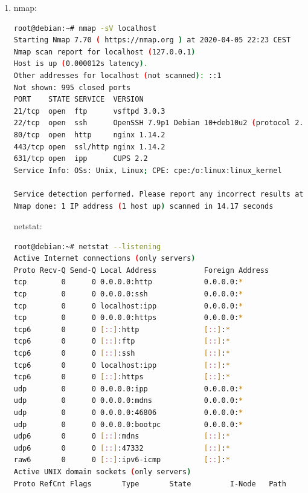 \documentclass[10pt,a4paper]{article}
\begin{document}
\begin{enumerate}[label=\textbf{\alph*)}]
\item nmap:
\begin{lstlisting}[language=bash]
root@debian:~# nmap -sV localhost
Starting Nmap 7.70 ( https://nmap.org ) at 2020-04-05 22:23 CEST
Nmap scan report for localhost (127.0.0.1)
Host is up (0.000012s latency).
Other addresses for localhost (not scanned): ::1
Not shown: 995 closed ports
PORT    STATE SERVICE  VERSION
21/tcp  open  ftp      vsftpd 3.0.3
22/tcp  open  ssh      OpenSSH 7.9p1 Debian 10+deb10u2 (protocol 2.0)
80/tcp  open  http     nginx 1.14.2
443/tcp open  ssl/http nginx 1.14.2
631/tcp open  ipp      CUPS 2.2
Service Info: OSs: Unix, Linux; CPE: cpe:/o:linux:linux_kernel

Service detection performed. Please report any incorrect results at https://nmap.org/submit/ .
Nmap done: 1 IP address (1 host up) scanned in 14.17 seconds
\end{lstlisting}
netstat:
\begin{lstlisting}[language=bash]
root@debian:~# netstat --listening
Active Internet connections (only servers)
Proto Recv-Q Send-Q Local Address           Foreign Address         State      
tcp        0      0 0.0.0.0:http            0.0.0.0:*               LISTEN     
tcp        0      0 0.0.0.0:ssh             0.0.0.0:*               LISTEN     
tcp        0      0 localhost:ipp           0.0.0.0:*               LISTEN     
tcp        0      0 0.0.0.0:https           0.0.0.0:*               LISTEN     
tcp6       0      0 [::]:http               [::]:*                  LISTEN     
tcp6       0      0 [::]:ftp                [::]:*                  LISTEN     
tcp6       0      0 [::]:ssh                [::]:*                  LISTEN     
tcp6       0      0 localhost:ipp           [::]:*                  LISTEN     
tcp6       0      0 [::]:https              [::]:*                  LISTEN     
udp        0      0 0.0.0.0:ipp             0.0.0.0:*                          
udp        0      0 0.0.0.0:mdns            0.0.0.0:*                          
udp        0      0 0.0.0.0:46806           0.0.0.0:*                          
udp        0      0 0.0.0.0:bootpc          0.0.0.0:*                          
udp6       0      0 [::]:mdns               [::]:*                             
udp6       0      0 [::]:47332              [::]:*                             
raw6       0      0 [::]:ipv6-icmp          [::]:*                  7          
Active UNIX domain sockets (only servers)
Proto RefCnt Flags       Type       State         I-Node   Path

\end{lstlisting}
\end{enumerate}
\end{document}
